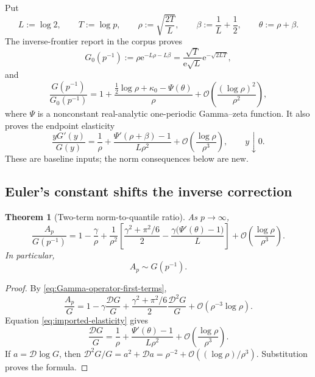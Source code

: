 \documentclass[11pt,oneside]{article}
\numberwithin{equation}{section}
\theoremstyle{plain}
\newtheorem{theorem}{Theorem}[section]
\theoremstyle{definition}
\theoremstyle{remark}
\newcommand{\e}{\mathrm e}
\newcommand{\bigO}{\mathcal O}
\newcommand{\Dop}{\mathscr D}
\begin{document}
Put
\begin{equation}
 L:=\log2,
 \qquad T:=\log p,
 \qquad
 \rho:=\sqrt{\frac{2T}{L}},
 \qquad
 \beta:=\frac1L+\frac12,
 \qquad
 \theta:=\rho+\beta.
 \label{eq:rho-beta-theta}
\end{equation}
The inverse-frontier report in the corpus proves
\begin{equation}
 G_0(p^{-1})
 :=\rho\e^{-L\rho-L\beta}
 =\frac{\sqrt T}{\e\sqrt L}\e^{-\sqrt{2LT}},
 \label{eq:G0-p}
\end{equation}
and
\begin{equation}
 \frac{G(p^{-1})}{G_0(p^{-1})}
 =1+\frac{\frac12\log\rho+\kappa_0-\Psi(\theta)}{\rho}
 +\bigO\!\left(\frac{(\log\rho)^2}{\rho^2}\right),
 \label{eq:imported-G-expansion}
\end{equation}
where $\Psi$ is a nonconstant real-analytic one-periodic Gamma--zeta function.  It also proves
the endpoint elasticity
\begin{equation}
 \frac{yG'(y)}{G(y)}
 =\frac1\rho+\frac{\Psi'(\rho+\beta)-1}{L\rho^2}
 +\bigO\!\left(\frac{\log\rho}{\rho^3}\right),
 \qquad y\downarrow0.
 \label{eq:imported-elasticity}
\end{equation}
These are baseline inputs; the norm consequences below are new.

\subsection{Euler's constant shifts the inverse correction}

\begin{theorem}[Two-term norm-to-quantile ratio]
\label{thm:norm-quantile-ratio}
As $p\to\infty$,
\begin{equation}
 \boxed{
 \frac{A_p}{G(p^{-1})}
 =1-\frac{\gamma}{\rho}
 +\frac{1}{\rho^2}
 \left[
 \frac{\gamma^2+\pi^2/6}{2}
 -\frac{\gamma\bigl(\Psi'(\theta)-1\bigr)}{L}
 \right]
 +\bigO\!\left(\frac{\log\rho}{\rho^3}\right).}
 \label{eq:norm-quantile-two-term}
\end{equation}
In particular,
\begin{equation}
 \boxed{A_p\sim G(p^{-1}).}
 \label{eq:Ap-G-equivalent}
\end{equation}
\end{theorem}

\begin{proof}
By \eqref{eq:Gamma-operator-first-terms},
\[
 \frac{A_p}{G}
 =1-\gamma\frac{\Dop G}{G}
 +\frac{\gamma^2+\pi^2/6}{2}\frac{\Dop^2G}{G}
 +\bigO(\rho^{-3}\log\rho).
\]
Equation \eqref{eq:imported-elasticity} gives
\[
 \frac{\Dop G}{G}
 =\frac1\rho+\frac{\Psi'(\theta)-1}{L\rho^2}
 +\bigO\!\left(\frac{\log\rho}{\rho^3}\right).
\]
If $a=\Dop\log G$, then
$\Dop^2G/G=a^2+\Dop a=\rho^{-2}+\bigO((\log\rho)/\rho^3)$.
Substitution proves the formula.
\end{proof}
\end{document}
